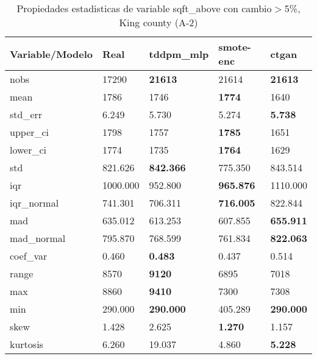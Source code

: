 \begin{table}[H]
\centering
\fontsize{8}{14}\selectfont
\caption{Propiedades estadisticas de variable sqft\_above con cambio\ensuremath{>}5\%, King county (A-2)}
\label{table-stats-king county-a-2-sqft_above-short}
\begin{tabular}{|l|m{10em}|m{10em}|m{10em}|m{10em}|}
\hline
 \rowcolor[gray]{0.8}
Variable/Modelo & Real & tddpm\_mlp & smote-enc & ctgan \\
\hline nobs & 17290 & \bfseries 21613 & \cellcolor[rgb]{0.9, 0.54, 0.52} 21614 & \bfseries 21613 \\
\hline mean & 1786 & 1746 & \bfseries 1774 & \cellcolor[rgb]{0.9, 0.54, 0.52} 1640 \\
\hline std\_err & 6.249 & 5.730 & \cellcolor[rgb]{0.9, 0.54, 0.52} 5.274 & \bfseries 5.738 \\
\hline upper\_ci & 1798 & 1757 & \bfseries 1785 & \cellcolor[rgb]{0.9, 0.54, 0.52} 1651 \\
\hline lower\_ci & 1774 & 1735 & \bfseries 1764 & \cellcolor[rgb]{0.9, 0.54, 0.52} 1629 \\
\hline std & 821.626 & \bfseries 842.366 & \cellcolor[rgb]{0.9, 0.54, 0.52} 775.350 & 843.514 \\
\hline iqr & 1000.000 & 952.800 & \bfseries 965.876 & \cellcolor[rgb]{0.9, 0.54, 0.52} 1110.000 \\
\hline iqr\_normal & 741.301 & 706.311 & \bfseries 716.005 & \cellcolor[rgb]{0.9, 0.54, 0.52} 822.844 \\
\hline mad & 635.012 & 613.253 & \cellcolor[rgb]{0.9, 0.54, 0.52} 607.855 & \bfseries 655.911 \\
\hline mad\_normal & 795.870 & 768.599 & \cellcolor[rgb]{0.9, 0.54, 0.52} 761.834 & \bfseries 822.063 \\
\hline coef\_var & 0.460 & \bfseries 0.483 & 0.437 & \cellcolor[rgb]{0.9, 0.54, 0.52} 0.514 \\
\hline range & 8570 & \bfseries 9120 & \cellcolor[rgb]{0.9, 0.54, 0.52} 6895 & 7018 \\
\hline max & 8860 & \bfseries 9410 & \cellcolor[rgb]{0.9, 0.54, 0.52} 7300 & 7308 \\
\hline min & 290.000 & \bfseries 290.000 & \cellcolor[rgb]{0.9, 0.54, 0.52} 405.289 & \bfseries 290.000 \\
\hline skew & 1.428 & \cellcolor[rgb]{0.9, 0.54, 0.52} 2.625 & \bfseries 1.270 & 1.157 \\
\hline kurtosis & 6.260 & \cellcolor[rgb]{0.9, 0.54, 0.52} 19.037 & 4.860 & \bfseries 5.228 \\

\end{tabular}
\end{table}
